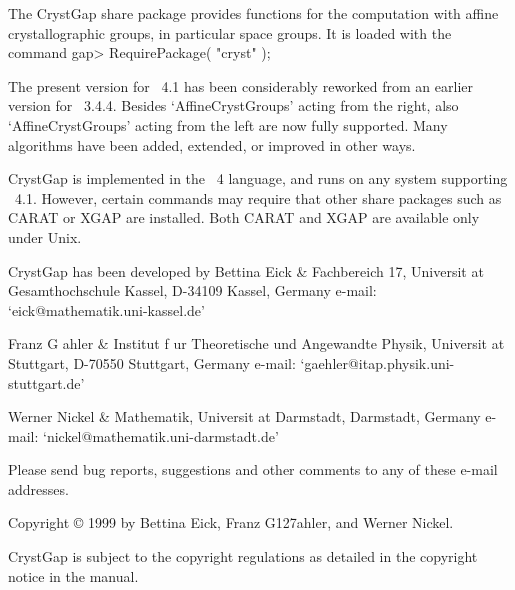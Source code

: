 
The CrystGap share package provides functions for the computation 
with affine crystallographic groups, in particular space groups.  
It is loaded with the command
\beginexample 
     gap> RequirePackage( "cryst" ); 
\endexample

The present version for {\GAP}~4.1 has been considerably reworked 
from an earlier version for {\GAP}~3.4.4. Besides `AffineCrystGroups'
acting from the right, also `AffineCrystGroups' acting from the 
left are now fully supported. Many algorithms have been added,
extended, or improved in other ways.

CrystGap is implemented in the {\GAP}~4 language, and runs on any 
system supporting {\GAP}~4.1. However, certain commands may require 
that other share packages such as CARAT or XGAP are installed. 
Both CARAT and XGAP are available only under Unix.

CrystGap has been developed by
\beginitems
Bettina Eick &
Fachbereich 17,
Universit{ a}t Gesamthochschule Kassel,
D-34109 Kassel, Germany \hfill\break 
e-mail: `eick@mathematik.uni-kassel.de'

Franz G{ a}hler &
Institut f{ u}r Theoretische und Angewandte Physik,\hfil\break
Universit{ a}t Stuttgart,
D-70550 Stuttgart, Germany \hfill\break
e-mail: `gaehler@itap.physik.uni-stuttgart.de'

Werner Nickel &
Mathematik,
Universit{ a}t Darmstadt, \hfill\break
Darmstadt, Germany \hfill\break
e-mail: `nickel@mathematik.uni-darmstadt.de'
\enditems

Please send bug reports, suggestions and other comments to any of these
e-mail addresses.

\vfill
Copyright {\copyright} 1999 
by Bettina Eick, Franz G\accent127ahler, and Werner Nickel.

\smallskip
CrystGap is subject to the {\GAP} copyright regulations as 
detailed in the copyright notice in the {\GAP} manual.






